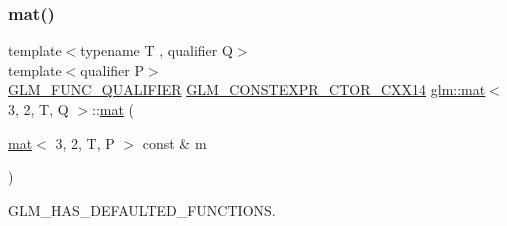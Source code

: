\mbox{\label{structglm_1_1mat_3_013_00_012_00_01_t_00_01_q_01_4_a0d749576b4014d88c52fe8df4b559333}} 
\subsubsection{\texorpdfstring{mat()}{mat()}\hspace{0.1cm}{\footnotesize\ttfamily [18/21]}}
{\footnotesize\ttfamily template$<$typename T , qualifier Q$>$ \\
template$<$qualifier P$>$ \\
\mbox{\hyperlink{setup_8hpp_a33fdea6f91c5f834105f7415e2a64407}{G\+L\+M\+\_\+\+F\+U\+N\+C\+\_\+\+Q\+U\+A\+L\+I\+F\+I\+ER}} \mbox{\hyperlink{setup_8hpp_a0900f9145e68bf6061b6f5e7be3fa751}{G\+L\+M\+\_\+\+C\+O\+N\+S\+T\+E\+X\+P\+R\+\_\+\+C\+T\+O\+R\+\_\+\+C\+X\+X14}} \mbox{\hyperlink{structglm_1_1mat}{glm\+::mat}}$<$ 3, 2, T, Q $>$\+::\mbox{\hyperlink{structglm_1_1mat}{mat}} (\begin{DoxyParamCaption}\item[{\mbox{\hyperlink{structglm_1_1mat}{mat}}$<$ 3, 2, T, P $>$ const \&}]{m }\end{DoxyParamCaption})}



G\+L\+M\+\_\+\+H\+A\+S\+\_\+\+D\+E\+F\+A\+U\+L\+T\+E\+D\+\_\+\+F\+U\+N\+C\+T\+I\+O\+NS. 

\mbox{\label{structglm_1_1mat_3_013_00_012_00_01_t_00_01_q_01_4_a83ed0230699667e599d391d6ccd411eb}} 
